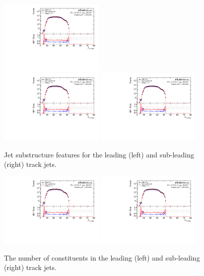 \begin{figure}[h!]
      \includegraphics[page=120,width=0.45\textwidth]{figures/ZjetOmnifoldMCDataComp.pdf}\\
  \includegraphics[page=112,width=0.45\textwidth]{figures/ZjetOmnifoldMCDataComp.pdf}
      \includegraphics[page=124,width=0.45\textwidth]{figures/ZjetOmnifoldMCDataComp.pdf}
  \caption{Jet substructure features for the leading (left) and sub-leading (right) track jets.}
  \label{fig:jetsubstructure}
\end{figure}

\begin{figure}[h!]
  \centering
  \includegraphics[page=136,width=0.45\textwidth]{figures/ZjetOmnifoldMCDataComp.pdf}
  \includegraphics[page=140,width=0.45\textwidth]{figures/ZjetOmnifoldMCDataComp.pdf} \\
  \caption{The number of constituents in the leading (left) and sub-leading (right) track jets.}
  \label{fig:ntrackinjets}
\end{figure}

